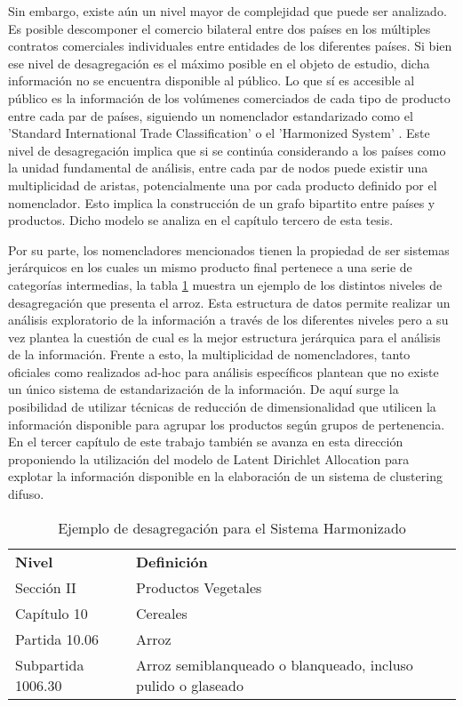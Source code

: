 \documentclass[class=article, crop=false]{standalone}
\begin{document}
Sin embargo, existe aún un nivel mayor de complejidad que puede ser analizado. Es posible descomponer el comercio bilateral entre dos países en los múltiples contratos comerciales individuales entre entidades de los diferentes países. Si bien ese nivel de desagregación es el máximo posible en el objeto de estudio, dicha información no se encuentra disponible al público. Lo que sí es accesible al público es la información de los volúmenes comerciados de cada tipo de producto entre cada par de países, siguiendo un nomenclador estandarizado como el 'Standard International Trade Classification' \citep{un2006standard} o el 'Harmonized System' \citep{weerth2008basic}. 
Este nivel de desagregación implica que si se continúa considerando a los países como la unidad fundamental de análisis, entre cada par de nodos puede existir una multiplicidad de aristas, potencialmente una por cada producto definido por el nomenclador. Esto implica la construcción de un grafo bipartito entre países y productos. Dicho modelo se analiza en el capítulo tercero de esta tesis. 

Por su parte, los nomencladores mencionados tienen la propiedad de ser sistemas jerárquicos en los cuales un mismo producto final pertenece a una serie de categorías intermedias, la tabla  \ref{table:ejemplo-hs} muestra un ejemplo de los distintos niveles de desagregación que presenta el arroz. Esta estructura de datos permite realizar un análisis exploratorio de la información a través de los diferentes niveles pero a su vez plantea la cuestión de cual es la mejor estructura jerárquica para el análisis de la información. Frente a esto, la multiplicidad de nomencladores, tanto oficiales como realizados ad-hoc para análisis específicos \citep{molinari2016especializacion} plantean que no existe un único sistema de estandarización de la información. De aquí surge la posibilidad de utilizar técnicas de reducción de dimensionalidad que utilicen la información disponible para agrupar los productos según grupos de pertenencia. En el tercer capítulo de este trabajo también se avanza en esta dirección proponiendo la utilización del modelo de Latent Dirichlet Allocation \citep{blei2003latent} para explotar la información disponible en la elaboración de un sistema de clustering difuso. 

\begin{table}[]
	\begin{tabular}{ll}
		\textbf{Nivel}     & \textbf{Definición}                                          \\
		Sección II         & Productos Vegetales                                          \\
		Capítulo 10        & Cereales                                                     \\
		Partida 10.06      & Arroz                                                        \\
		Subpartida 1006.30 & Arroz semiblanqueado o blanqueado, incluso pulido o glaseado
	\end{tabular}
	\caption{Ejemplo de desagregación para el Sistema Harmonizado}
	\label{table:ejemplo-hs}
\end{table}
\end{document}
